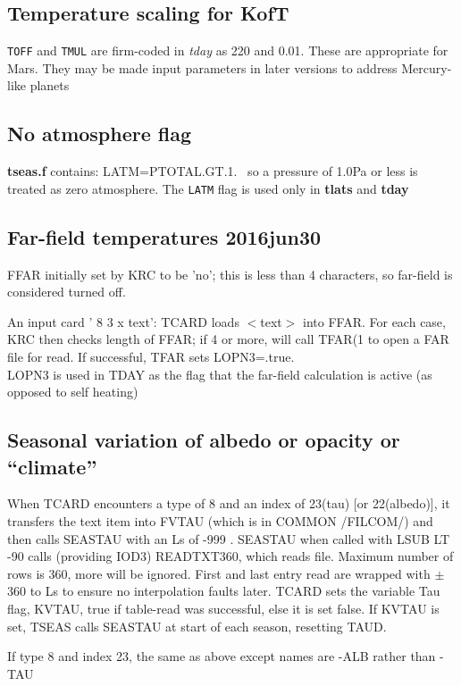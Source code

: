 \documentclass{article}
\newcommand{\np}{\textbf}  %
\newcommand{\nf}{\textit}  %
\newcommand{\nv}{\texttt}  %
\begin{document}
\subsection{Temperature scaling for KofT} 
\nv{TOFF} and \nv{TMUL} are firm-coded in \nf{tday} as 220 and 0.01. These are appropriate for Mars.
They may be made input parameters in later versions to address Mercury-like planets

\subsection{No atmosphere flag}
\np{tseas.f} contains: LATM=PTOTAL.GT.1. \ so a pressure of 1.0Pa or less is
treated as zero atmosphere. The \nv{LATM} flag is used only in \np{tlats} and
\np{tday}


\subsection{ Far-field temperatures 2016jun30}
FFAR initially set by KRC to be 'no'; this is less than 4 characters, so
far-field is considered turned off.

An input card ' 8 3 x text': TCARD loads $<$text$>$ into FFAR. 
For each case, KRC then checks length of FFAR; if 4 or more, will call TFAR(1 
to open a FAR file for read. If successful, TFAR sets LOPN3=.true. 
\\ LOPN3 is used in TDAY as the flag that the far-field calculation is active
(as opposed to self heating)

\subsection{ Seasonal variation of albedo or opacity or ``climate''}%

When TCARD encounters a type of 8 and an index of 23(tau) [or 22(albedo)], it
transfers the text item into FVTAU (which is in COMMON /FILCOM/) and then calls
SEASTAU with an Ls of -999 .  SEASTAU when called with LSUB LT -90 calls
(providing IOD3) READTXT360, which reads file. Maximum number of rows is 360,
more will be ignored. First and last entry read are wrapped with $\pm$360 to Ls
to ensure no interpolation faults later. TCARD sets the variable Tau flag, KVTAU,
true if table-read was successful, else it is set false.
If KVTAU is set, TSEAS calls SEASTAU at start of each season, resetting TAUD. 

If type 8 and index 23, the same as above except names are -ALB rather than -TAU
\end{document}
